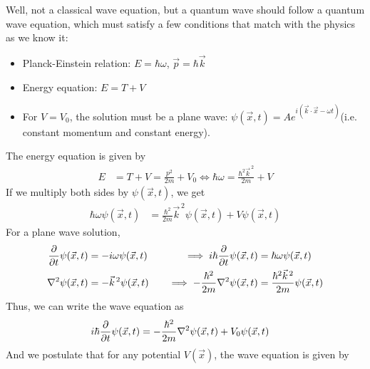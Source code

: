 Well, not a classical wave equation, but a quantum wave should follow a quantum wave equation, which must satisfy a few conditions that match with the physics as we know it:
\begin{itemize}
  \item Planck-Einstein relation: $E = \hbar \omega$, $\vec{p} = \hbar \vec{k}$
  \item Energy equation: $E = T + V$
  \item For $V = V_0$, the solution must be a plane wave: $\psi(\vec{x}, t) = A e^{i (\vec{k} \cdot \vec{x} - \omega t)}$(i.e. constant momentum and constant energy).
\end{itemize}
The energy equation is given by
\begin{align}
  E & = T + V = \frac{p^2}{2m} + V_0 \iff \hbar \omega = \frac{\hbar^2 \vec{k}^{\,2}}{2m} + V
\end{align}
If we multiply both sides by $\psi(\vec{x}, t)$, we get
\begin{align}
  \hbar \omega \psi(\vec{x}, t) & = \frac{\hbar^2}{2m} \vec{k}^{\,2} \psi(\vec{x}, t) + V \psi(\vec{x}, t)
\end{align}
For a plane wave solution,
\begin{alignat}{2}
  \pdv{}{t} \psi(\vec{x}, t)                     & = - i \omega \psi(\vec{x}, t)
                                                 & \quad \implies
  i \hbar \pdv{}{t} \psi(\vec{x}, t)             & = \hbar \omega \psi(\vec{x}, t)                      \\
  \nabla^2 \psi(\vec{x}, t)                      & = - \vec{k}^{\,2} \psi(\vec{x}, t)
                                                 & \quad \implies
  - \frac{\hbar^2}{2m} \nabla^2 \psi(\vec{x}, t) & =  \frac{\hbar^2 \vec{k}^{\,2}}{2m} \psi(\vec{x}, t)
\end{alignat}
Thus, we can write the wave equation as
\begin{align}
  i \hbar \pdv{}{t} \psi(\vec{x}, t) & = - \frac{\hbar^2}{2m} \nabla^2 \psi(\vec{x}, t) + V_0 \psi(\vec{x}, t)
\end{align}
And we postulate that for any potential $V(\vec{x})$, the wave equation is given by
